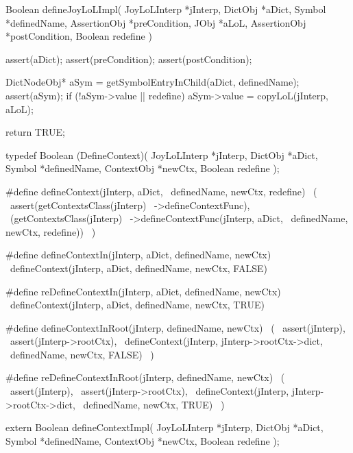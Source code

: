 \startCCode
Boolean defineJoyLoLImpl(
  JoyLoLInterp *jInterp,
  DictObj      *aDict,
  Symbol       *definedName,
  AssertionObj *preCondition,
  JObj         *aLoL,
  AssertionObj *postCondition,
  Boolean       redefine
) {
  assert(aDict);
  assert(preCondition);
  assert(postCondition);
  
  DictNodeObj* aSym = getSymbolEntryInChild(aDict, definedName);
  assert(aSym);
  if (!aSym->value || redefine) {
    aSym->value = copyLoL(jInterp, aLoL);
  }

  return TRUE;
}
\stopCCode

\startCHeader
typedef Boolean (DefineContext)(
  JoyLoLInterp *jInterp,
  DictObj      *aDict,
  Symbol       *definedName,
  ContextObj   *newCtx,
  Boolean       redefine
);

#define defineContext(jInterp, aDict,     \
  definedName, newCtx, redefine)          \
  (                                       \
    assert(getContextsClass(jInterp)      \
      ->defineContextFunc),               \
    (getContextsClass(jInterp)            \
      ->defineContextFunc(jInterp, aDict, \
        definedName, newCtx, redefine))   \
  )

#define defineContextIn(jInterp, aDict, definedName, newCtx)  \
  defineContext(jInterp, aDict, definedName, newCtx, FALSE)

#define reDefineContextIn(jInterp, aDict, definedName, newCtx)  \
  defineContext(jInterp, aDict, definedName, newCtx, TRUE)

#define defineContextInRoot(jInterp, definedName, newCtx) \
  (                                                       \
    assert(jInterp),                                      \
    assert(jInterp->rootCtx),                             \
    defineContext(jInterp, jInterp->rootCtx->dict,        \
      definedName, newCtx, FALSE)                         \
  )

#define reDefineContextInRoot(jInterp, definedName, newCtx) \
  (                                                         \
    assert(jInterp),                                        \
    assert(jInterp->rootCtx),                               \
    defineContext(jInterp, jInterp->rootCtx->dict,          \
      definedName, newCtx, TRUE)                            \
  )
\stopCHeader

\setCHeaderStream{private}
\startCHeader
extern Boolean defineContextImpl(
  JoyLoLInterp *jInterp,
  DictObj      *aDict,
  Symbol       *definedName,
  ContextObj   *newCtx,
  Boolean       redefine
);
\stopCHeader
\setCHeaderStream{public}

